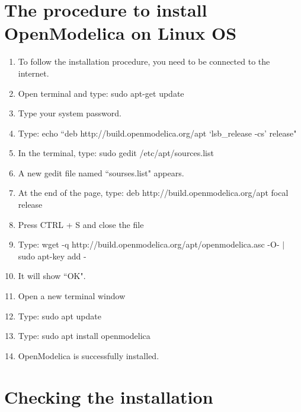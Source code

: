 \documentclass[a4paper,12pt]{article}
\begin{document}
\section{The procedure to install OpenModelica on Linux OS}

\begin{enumerate}
	
\item To follow the installation procedure, you need to be connected to the internet.
\item Open terminal and type: sudo apt-get update
\item Type your system password.
\item Type: echo ``deb http://build.openmodelica.org/apt `lsb\_release -cs' release"
\item In the terminal, type: sudo gedit /etc/apt/sources.list
\item A new gedit file named ``sourses.list" appears.
\item At the end of the page, type: deb http://build.openmodelica.org/apt focal release
\item Press CTRL + S and close the file
\item Type: wget -q http://build.openmodelica.org/apt/openmodelica.asc -O- $|$ sudo apt-key add -
\item It will show ``OK".
\item Open a new terminal window
\item Type: sudo apt update
\item Type: sudo apt install openmodelica
\item OpenModelica is successfully installed.
\end{enumerate}

\section{Checking the installation}
\end{document}
